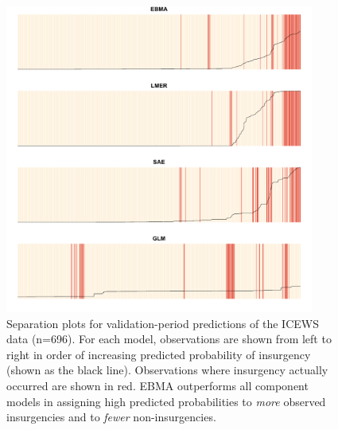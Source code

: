 \begin{figure}[p]
 \caption{\footnotesize Separation plots for validation-period
    predictions of the ICEWS data (n=696).  For each model,
    observations are shown from left to right in order of increasing
    predicted probability of insurgency (shown as the black line).
    Observations where insurgency actually occurred are shown in
    red. EBMA outperforms all component models in assigning high
    predicted probabilities to \textit{more} observed insurgencies and
    to \textit{fewer} non-insurgencies.}
\label{InSam1sep}
\begin{center}
\includegraphics[width=4in]{Insample2-1.pdf}
\end{center}
\end{figure}

